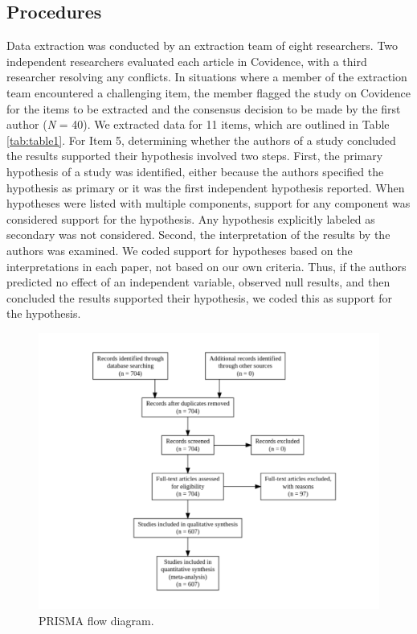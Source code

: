 \documentclass[
  man, donotrepeattitle,mask,floatsintext]{apa7}
\begin{document}
\hypertarget{procedures}{%
\subsection{Procedures}\label{procedures}}

Data extraction was conducted by an extraction team of eight researchers. Two independent researchers evaluated each article in Covidence, with a third researcher resolving any conflicts. In situations where a member of the extraction team encountered a challenging item, the member flagged the study on Covidence for the items to be extracted and the consensus decision to be made by the first author (\emph{N} = 40). We extracted data for 11 items, which are outlined in Table \ref{tab:table1}. For Item 5, determining whether the authors of a study concluded the results supported their hypothesis involved two steps. First, the primary hypothesis of a study was identified, either because the authors specified the hypothesis as primary or it was the first independent hypothesis reported. When hypotheses were listed with multiple components, support for any component was considered support for the hypothesis. Any hypothesis explicitly labeled as secondary was not considered. Second, the interpretation of the results by the authors was examined. We coded support for hypotheses based on the interpretations in each paper, not based on our own criteria. Thus, if the authors predicted no effect of an independent variable, observed null results, and then concluded the results supported their hypothesis, we coded this as support for the hypothesis.

\pagebreak

\begin{figure}

{\centering \includegraphics{../../figs/fig1} 

}

\caption{PRISMA flow diagram.}\label{fig:fig1}
\end{figure}
\end{document}
